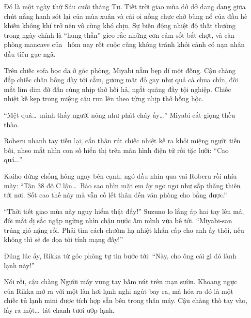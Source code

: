 \documentclass[../main.tex]{subfiles}
\begin{document}

Đó là một ngày thứ Sáu cuối tháng Tư. Tiết trời giao mùa dở dở dang dang giữa chút nắng hanh sót lại của mùa xuân và cái oi nồng chực chờ bùng nổ của đầu hè khiến không khí trở nên vô cùng khó chịu. Sự biến động nhiệt độ thất thường trong ngày chính là ``hung thần'' gieo rắc những cơn cảm sốt bất chợt, và căn phòng mancave của \hls\ hôm nay rốt cuộc cũng không tránh khỏi cảnh có nạn nhân đầu tiên gục ngã.

Trên chiếc sofa bọc da ở góc phòng, Miyabi nằm bẹp dí một đống. Cậu chàng đắp chiếc chăn bông dày tới cằm, gương mặt đỏ gay như quả cà chua chín, đôi mắt lim dim đờ đẫn cùng nhịp thở hối hả, ngắt quãng đầy tội nghiệp. Chiếc nhiệt kế kẹp trong miệng cậu run lên theo từng nhịp thở hồng hộc.

``Mệt quá\dots\ mình thấy người nóng như phát cháy ấy\dots'' Miyabi cất giọng thều thào.


Roberu nhanh tay tiến lại, cẩn thận rút chiếc nhiệt kế ra khỏi miệng người tiền bối, nheo mắt nhìn con số hiển thị trên màn hình điện tử rồi tặc lưỡi: ``Cao quá\dots''

Kaiho đứng chống hông ngay bên cạnh, ngó đầu nhìn qua vai Roberu rồi nhíu mày: ``Tận 38 độ C lận\dots\ Bảo sao nhìn mặt em ấy ngơ ngơ như sắp thăng thiên tới nơi. Sốt cao thế này mà vẫn cố lết thân đến văn phòng cho bằng được.''

``Thời tiết giao mùa này nguy hiểm thật đấy!'' Suzuno lo lắng áp hai tay lên má, đôi mắt dị sắc ngập ngừng nhìn chậu nước ấm mình vừa bê tới. ``Miyabi-san trúng gió nặng rồi. Phải tìm cách chườm hạ nhiệt khẩn cấp cho anh ấy thôi, nếu không thì sẽ đe dọa tới tính mạng đấy!''

Đúng lúc ấy, Rikka từ góc phòng tự tin bước tới: ``Này, cho ông cái gì đó lành lạnh này!''

Nói rồi, cậu chàng Người máy vung tay bấm nút trên mạn sườn. Khoang ngực của Rikka mở ra với một làn hơi lạnh nghi ngút bay ra, mà hóa ra đó là một chiếc tủ lạnh mini được tích hợp sẵn bên trong thân máy. Cậu chàng thò tay vào, lấy ra một\dots\ lát chanh tươi ướp lạnh.
\end{document}
